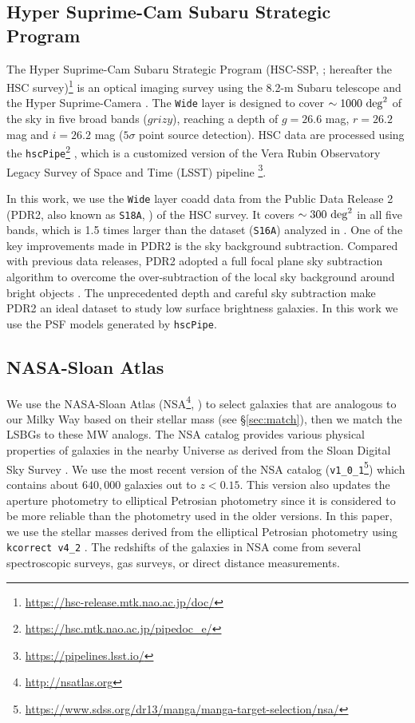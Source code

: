 \documentclass[twocolumn,astrosymb,twocolappendix]{aastex631}
\newcommand{\code}[1]{\texttt{#1}}
\begin{document}
\begin{CJK*}{UTF8}{gbsn}
\subsection{Hyper Suprime-Cam Subaru Strategic Program}
The Hyper Suprime-Cam Subaru Strategic Program (HSC-SSP, \citealt{Aihara2018}; hereafter the HSC survey)\footnote{\url{https://hsc-release.mtk.nao.ac.jp/doc/}} is an optical imaging survey using the 8.2-m Subaru telescope and the Hyper Suprime-Camera \citep{Miyazaki2012, Miyazaki2018}. The \texttt{Wide} layer is designed to cover $\sim 1000\ \rm{deg}^{2}$ of the sky in five broad bands ($grizy$), reaching a depth of $g=26.6$ mag, $r=26.2$ mag and $i=26.2$ mag ($5\sigma$ point source detection). HSC data are processed using the \code{hscPipe}\footnote{\url{https://hsc.mtk.nao.ac.jp/pipedoc_e/}} \citep{Bosch2018}, which is a customized version of the Vera Rubin Observatory Legacy Survey of Space and Time (LSST) pipeline \citep{LSST-pipeline}\footnote{\url{https://pipelines.lsst.io/}}.

In this work, we use the \code{Wide} layer coadd data from the Public Data Release 2 (PDR2, also known as \code{S18A}, \citealt{Aihara2018}) of the HSC survey. It covers $\sim 300\ \rm{deg}^2$ in all five bands, which is 1.5 times larger than the dataset (\code{S16A}) analyzed in \citet{Greco2018}. One of the key improvements made in PDR2 is the sky background subtraction. Compared with previous data releases, PDR2 adopted a full focal plane sky subtraction algorithm to overcome the over-subtraction of the local sky background around bright objects \citep{Aihara2018,Li2021}. The unprecedented depth and careful sky subtraction make PDR2 an ideal dataset to study low surface brightness galaxies. In this work we use the PSF models generated by \code{hscPipe}. 


\subsection{NASA-Sloan Atlas}
We use the NASA-Sloan Atlas (NSA\footnote{\url{http://nsatlas.org}}, \citealt{Blanton2005,Blanton2011}) to select galaxies that are analogous to our Milky Way based on their stellar mass (see \S\ref{sec:match}), then we match the LSBGs to these MW analogs. The NSA catalog provides various physical properties of galaxies in the nearby Universe as derived from the Sloan Digital Sky Survey \citep[SDSS,][]{York2000}. We use the most recent version of the NSA catalog (\code{v1\_0\_1}\footnote{\url{https://www.sdss.org/dr13/manga/manga-target-selection/nsa/}}) which contains about $640,000$ galaxies out to $z < 0.15$. This version also updates the aperture photometry to elliptical Petrosian photometry since it is considered to be more reliable than the photometry used in the older versions. In this paper, we use the stellar masses derived from the elliptical Petrosian photometry using \code{kcorrect v4\_2} \citep{Blanton2007}. The redshifts of the galaxies in NSA come from several spectroscopic surveys,  gas surveys, or direct distance measurements. 


\end{CJK*}
\end{document}
